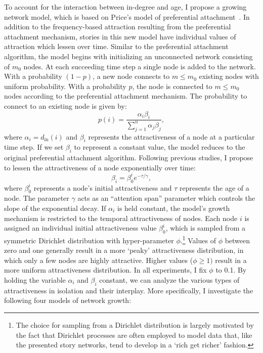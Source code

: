 To account for the interaction between in-degree and age, I propose a growing network model, which is based on Price's model of preferential attachment~\autocite{price:1976}. In addition to the frequency-based attraction resulting from the preferential attachment mechanism, stories in this new model have individual values of attraction which lessen over time\autocite[Cf.][]{dorogovtsev:2000,eom:2011,Goldberg:2015}. Similar to the preferential attachment algorithm, the model begins with initializing an unconnected network consisting of $m_0$ nodes. At each succeeding time step a single node is added to the network. With a probability $(1 - p)$, a new node connects to $m \leq m_0$ existing nodes with uniform probability. With a probability $p$, the node is connected to $m \leq m_0$ nodes according to the preferential attachment mechanism. The probability to connect to an existing node is given by:
\begin{equation}
p(i) = \frac{\alpha_i \beta_i}{\sum^n_{j=1} \alpha_j \beta_j},
\end{equation}
where $\alpha_i = d_{\text{in}}(i)$ and $\beta_i$ represents the attractiveness of a node at a particular time step. If we set $\beta_i$ to represent a constant value, the model reduces to the original preferential attachment algorithm. Following previous studies\autocite[E.g.][]{eom:2011,Goldberg:2015}, I propose to lessen the attractiveness of a node exponentially over time:\autocite[Eom \& Fortunato add a node's in-degree to its attractiveness at a particular time step. In this study, I choose to weigh a node's in-degree by its attractiveness by \emph{multiplying} the two values. Cf.][]{eom:2011}
\begin{equation}
\beta_i = \beta^i_0 e^{- \tau / \gamma},
\end{equation}
where $\beta^i_0$ represents a node's initial attractiveness and $\tau$ represents the age of a node. The parameter $\gamma$ acts as an ``attention span'' parameter which controls the slope of the exponential decay\autocite{Goldberg:2015}. If $\alpha_i$ is held constant, the model's growth mechanism is restricted to the temporal attractiveness of nodes. Each node $i$ is assigned an individual initial attractiveness value $\beta^i_0$, which is sampled from a symmetric Dirichlet distribution with hyper-parameter $\phi$.\footnote{The choice for sampling from a Dirichlet distribution is largely motivated by the fact that Dirichlet processes are often employed to model data that, like the presented story networks, tend to develop in a `rich get richer' fashion.} Values of $\phi$ between zero and one generally result in a more `peaky' attractiveness distribution, in which only a few nodes are highly attractive. Higher values ($\phi \geq 1)$ result in a more uniform attractiveness distribution. In all experiments, I fix $\phi$ to 0.1. By holding the variable $\alpha_i$ and $\beta_i$ constant, we can analyze the various types of attractiveness in isolation and their interplay. More specifically, I investigate the following four models of network growth:
